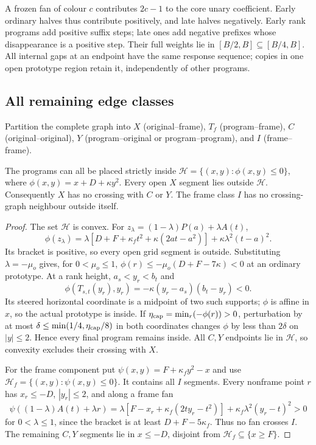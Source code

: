 A frozen fan of colour $c$ contributes $2c-1$ to the core unary coefficient. Early ordinary halves thus contribute positively, and late halves negatively. Early rank programs add positive suffix steps; late ones add negative prefixes whose disappearance is a positive step. Their full weights lie in $[B/2,B]\subseteq[B/4,B]$. All internal gaps at an endpoint have the same response sequence; copies in one open prototype region retain it, independently of other programs.

\subsection{All remaining edge classes}
Partition the complete graph into $X$ (original--frame), $T_f$ (program--frame), $C$ (original--original), $Y$ (program--original or program--program), and $I$ (frame--frame).
\begin{lemma}\label{lem:separation}
The programs can all be placed strictly inside $\mathcal H=\{(x,y):\phi(x,y)\leq0\}$, where $\phi(x,y)=x+D+\kappa y^2$. Every open $X$ segment lies outside $\mathcal H$. Consequently $X$ has no crossing with $C$ or $Y$. The frame class $I$ has no crossing-graph neighbour outside itself.
\end{lemma}
\begin{proof}
The set $\mathcal H$ is convex. For $z_\lambda=(1-\lambda)P(a)+\lambda A(t)$,
\begin{equation}\label{eq:cap-ray}
\phi(z_\lambda)=\lambda[D+F+\kappa_ft^2+\kappa(2at-a^2)]+\kappa\lambda^2(t-a)^2.
\end{equation}
Its bracket is positive, so every open grid segment is outside. Substituting $\lambda=-\mu_o$ gives, for $0<\mu_o\leq1$,
$\phi(r)\leq-\mu_o(D+F-7\kappa)<0$ at an ordinary prototype. At a rank height, $a_s<y_r<b_t$ and
\[
\phi(T_{s,t}(y_r),y_r)=-\kappa(y_r-a_s)(b_t-y_r)<0.
\]
Its steered horizontal coordinate is a midpoint of two such supports; $\phi$ is affine in $x$, so the actual prototype is inside. If $\eta_{\rm cap}=\min_r(-\phi(r))>0$, perturbation by at most $\delta\leq\min(1/4,\eta_{\rm cap}/8)$ in both coordinates changes $\phi$ by less than $2\delta$ on $|y|\leq2$. Hence every final program remains inside. All $C,Y$ endpoints lie in $\mathcal H$, so convexity excludes their crossing with $X$.

For the frame component put $\psi(x,y)=F+\kappa_fy^2-x$ and use $\mathcal H_f=\{(x,y):\psi(x,y)\leq0\}$. It contains all $I$ segments. Every nonframe point $r$ has $x_r\leq-D$, $|y_r|\leq2$, and along a frame fan
\[
\psi((1-\lambda)A(t)+\lambda r)
=\lambda[F-x_r+\kappa_f(2ty_r-t^2)]+\kappa_f\lambda^2(y_r-t)^2>0
\]
for $0<\lambda\leq1$, since the bracket is at least $D+F-5\kappa_f$. Thus no fan crosses $I$. The remaining $C,Y$ segments lie in $x\leq-D$, disjoint from $\mathcal H_f\subseteq\{x\geq F\}$.
\end{proof}

